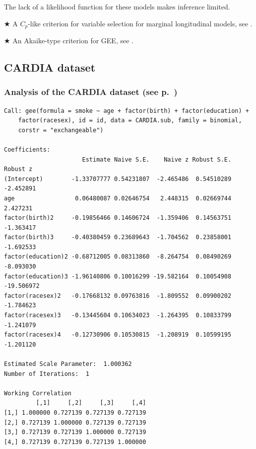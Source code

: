 \documentclass{beamer}
\newcommand{\bs}{\bigskip}
\begin{document}
\begin{frame}
\frametitle{}
The lack of a likelihood function for these models makes inference
limited.

\bs
\bs
{\color{red} $\bigstar$ A $C_p$-like criterion for variable selection
  for marginal longitudinal models, see .}

\bs
{\color{red} $\bigstar$ An Akaike-type criterion for GEE, see
  .}
\end{frame}

\subsection{CARDIA dataset}
\begin{frame}[fragile]
\frametitle{Analysis of the CARDIA dataset (see p.~\pageref{CARDIApage})}
{\tiny
\begin{verbatim}
Call: gee(formula = smoke ~ age + factor(birth) + factor(education) + 
    factor(racesex), id = id, data = CARDIA.sub, family = binomial, 
    corstr = "exchangeable")

Coefficients:
                      Estimate Naive S.E.    Naive z Robust S.E.   Robust z
(Intercept)        -1.33707777 0.54231807  -2.465486  0.54510289  -2.452891
age                 0.06480087 0.02646754   2.448315  0.02669744   2.427231
factor(birth)2     -0.19856466 0.14606724  -1.359406  0.14563751  -1.363417
factor(birth)3     -0.40380459 0.23689643  -1.704562  0.23858001  -1.692533
factor(education)2 -0.68712005 0.08313860  -8.264754  0.08490269  -8.093030
factor(education)3 -1.96140806 0.10016299 -19.582164  0.10054908 -19.506972
factor(racesex)2   -0.17668132 0.09763816  -1.809552  0.09900202  -1.784623
factor(racesex)3   -0.13445604 0.10634023  -1.264395  0.10833799  -1.241079
factor(racesex)4   -0.12730906 0.10530815  -1.208919  0.10599195  -1.201120

Estimated Scale Parameter:  1.000362
Number of Iterations:  1

Working Correlation
         [,1]     [,2]     [,3]     [,4]
[1,] 1.000000 0.727139 0.727139 0.727139
[2,] 0.727139 1.000000 0.727139 0.727139
[3,] 0.727139 0.727139 1.000000 0.727139
[4,] 0.727139 0.727139 0.727139 1.000000
\end{verbatim}
}
\end{frame}
\end{document}

